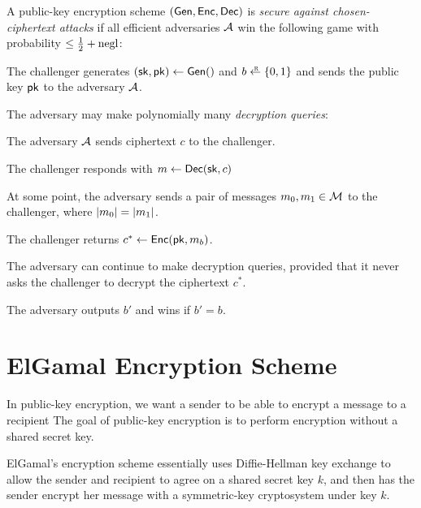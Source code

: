 \begin{definition}
  A public-key encryption scheme $(\mathsf{Gen}, \mathsf{Enc}, \mathsf{Dec})$ is \emph{secure against chosen-ciphertext attacks}
  if all efficient adversaries $\mathcal{A}$ 
  win the following game with probability $\leq \tfrac{1}{2} + \operatorname{negl}$:
\begin{compactitem}
\item The challenger generates $({\mathsf{sk}}, \mathsf{pk}) \gets \mathsf{Gen}()$ and $b \getsr \bin$ and sends 
  the public key $\mathsf{pk}$ to the adversary $\mathcal{A}$.
\item The adversary may make polynomially many \emph{decryption queries}:
    \begin{compactitem}
    \item The adversary $\mathcal{A}$ sends ciphertext $c$ to the challenger.
    \item The challenger responds with $m \gets \mathsf{Dec}({\mathsf{sk}}, c)$		
    \end{compactitem}
\item At some point, the adversary sends a pair of messages $m_0, m_1 \in \mathcal{M}$
  to the challenger, where $\left| m_0 \right|=\left| m_1 \right|$.
\item The challenger returns $c^* \gets \mathsf{Enc}(\mathsf{pk}, m_b)$.
\item The adversary can continue to make decryption queries, provided that
      it never asks the challenger to decrypt the ciphertext $c^*$.
\item The adversary outputs $b'$ and wins if $b' = b$.
\end{compactitem}
\end{definition}

\section{ElGamal Encryption Scheme}
In public-key encryption, we want a sender to be able to encrypt a message
to a recipient 
The goal of public-key encryption is to perform encryption without a shared secret key.

ElGamal's encryption scheme essentially uses Diffie-Hellman key exchange to allow
the sender and recipient to agree on a shared secret key $k$, and then has
the sender encrypt her message with a symmetric-key cryptosystem under key $k$.

